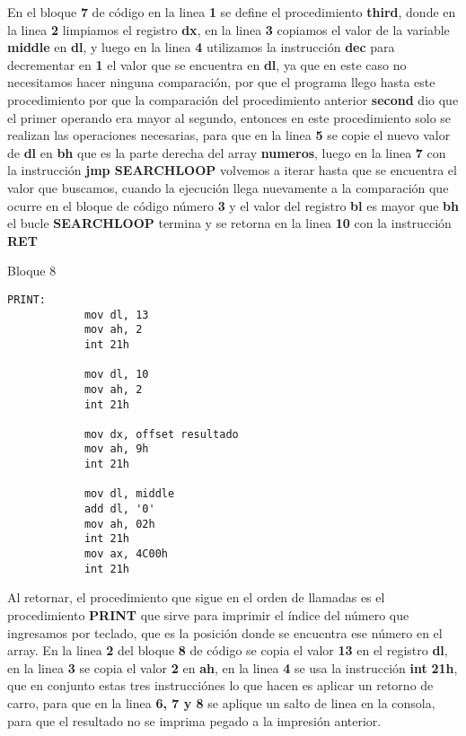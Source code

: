 \documentclass[a4paper,twoside]{article}
\newcommand{\codebordo}[1]{\textcolor{codebordo}{#1}}
\newcommand{\codeblue}[1]{\textcolor{codeblue}{#1}}
\begin{document}
  {\Large En el bloque \textbf{7} de código en la linea \textbf{1} se define el procedimiento \codeblue{\textbf{third}},
    donde en la linea \textbf{2} limpiamos el registro \codebordo{\textbf{dx}}, en la linea \textbf{3}
    copiamos el valor de la variable \textbf{middle} en \codebordo{\textbf{dl}}, y luego en la linea \textbf{4} 
    utilizamos la instrucción \codeblue{\textbf{dec}} para decrementar en \textbf{1} el valor que se encuentra en 
    \codebordo{\textbf{dl}}, ya que en este caso no necesitamos hacer ninguna comparación, por que el programa llego 
    hasta este procedimiento por que la comparación del procedimiento anterior \codeblue{\textbf{second}} dio que el primer
    operando era mayor al segundo, entonces en este procedimiento solo se realizan las operaciones necesarias, para que en 
    la linea \textbf{5} se copie el nuevo valor de \codebordo{\textbf{dl}} en \codebordo{\textbf{bh}} que es la parte 
    derecha del array \textbf{numeros}, luego en la linea \textbf{7} con la instrucción \codeblue{\textbf{jmp SEARCHLOOP}}
    volvemos a iterar hasta que se encuentra el valor que buscamos, cuando la ejecución llega nuevamente a la comparación 
    que ocurre en el bloque de código número \textbf{3} y el valor del registro \codebordo{\textbf{bl}} es mayor que 
    \codebordo{\textbf{bh}} el bucle \codeblue{\textbf{SEARCHLOOP}} termina y se retorna en la linea \textbf{10} con la 
    instrucción \codeblue{\textbf{RET}}
  }
 \vspace*{2cm}
\begin{center}
    {\normalsize Bloque 8}
    \begin{lstlisting}[language=8086] 
        PRINT:
            mov dl, 13
            mov ah, 2
            int 21h

            mov dl, 10
            mov ah, 2
            int 21h

            mov dx, offset resultado
            mov ah, 9h
            int 21h

            mov dl, middle
            add dl, '0'
            mov ah, 02h
            int 21h         
            mov ax, 4C00h
            int 21h
    \end{lstlisting}
\end{center}
\vspace*{1cm}
{\Large Al retornar, el procedimiento que sigue en el orden de llamadas es el procedimiento \codeblue{\textbf{PRINT}} que sirve para imprimir 
  el índice del número que ingresamos por teclado, que es la posición donde se encuentra ese número en el array.
  En la linea \textbf{2} del bloque \textbf{8} de código se copia el valor \textbf{13} en el registro \codebordo{\textbf{dl}}, en la linea \textbf{3} se 
  copia el valor \textbf{2} en \codebordo{\textbf{ah}}, en la linea \textbf{4} se usa la instrucción \codeblue{\textbf{int}} \textbf{21h}, que en conjunto
  estas tres instrucciónes lo que hacen es aplicar un retorno de carro, para que en la linea \textbf{6, 7 y 8} se aplique un salto de linea en la consola, 
  para que el resultado no se imprima pegado a la impresión anterior. 
 }
\end{document}
